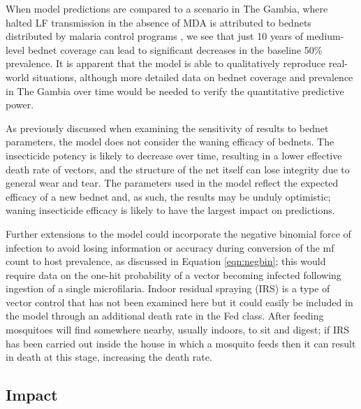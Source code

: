 \documentclass[5p,times]{elsarticle}
\begin{document}
When model predictions are compared to a scenario in The Gambia, where halted LF transmission in the absence of MDA is attributed to bednets distributed by malaria control programs \cite{rebollo2015}, we see that just 10 years of medium-level bednet coverage can lead to significant decreases in the baseline 50\% prevalence. It is apparent that the model is able to qualitatively reproduce real-world situations, although more detailed data on bednet coverage and prevalence in The Gambia over time would be needed to verify the quantitative predictive power. 

As previously discussed when examining the sensitivity of results to bednet parameters, the model does not consider the waning efficacy of bednets. The insecticide potency is likely to decrease over time, resulting in a lower effective death rate of vectors, and the structure of the net itself can lose integrity due to general wear and tear. The parameters used in the model reflect the expected efficacy of a new bednet and, as such, the results may be unduly optimistic; waning insecticide efficacy is likely to have the largest impact on predictions.

Further extensions to the model could incorporate the negative binomial force of infection to avoid losing information or accuracy during conversion of the mf count to host prevalence, as discussed in Equation \ref{eqn:negbin}; this would require data on the one-hit probability of a vector becoming infected following ingestion of a single microfilaria. Indoor residual spraying (IRS) is a type of vector control that has not been examined here but it could easily be included in the model through an additional death rate in the Fed class. After feeding mosquitoes will find somewhere nearby, usually indoors, to sit and digest; if IRS has been carried out inside the house in which a mosquito feeds then it can result in death at this stage, increasing the death rate.

\subsection{Impact}
\end{document}
